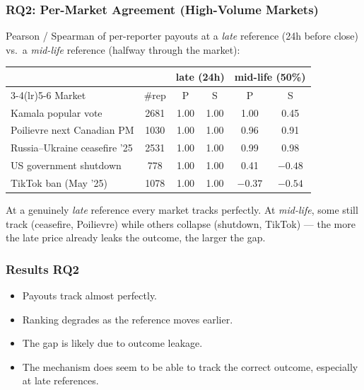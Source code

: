 \documentclass[
	11pt, %
]{beamer}
\begin{document}
\begin{frame}
	\frametitle{RQ2: Per-Market Agreement (High-Volume Markets)}

	Pearson / Spearman of per-reporter payouts at a \emph{late} reference (24h before close) vs.\ a \emph{mid-life} reference (halfway through the market):

	\medskip
	\begin{table}
		\centering
		\footnotesize
		\setlength{\tabcolsep}{6pt}
		\begin{tabular}{lccccc}
			\toprule
			& & \multicolumn{2}{c}{late (24h)} & \multicolumn{2}{c}{mid-life (50\%)} \\
			\cmidrule(lr){3-4}\cmidrule(lr){5-6}
			Market & \#rep & P & S & P & S \\
			\midrule
			Kamala popular vote        & 2681 & 1.00 & 1.00 & 1.00 & 0.45 \\
			Poilievre next Canadian PM & 1030 & 1.00 & 1.00 & 0.96 & 0.91 \\
			Russia--Ukraine ceasefire '25 & 2531 & 1.00 & 1.00 & 0.99 & 0.98 \\
			US government shutdown     &  778 & 1.00 & 1.00 & 0.41 & $-0.48$ \\
			TikTok ban (May '25)       & 1078 & 1.00 & 1.00 & $-0.37$ & $-0.54$ \\
			\bottomrule
		\end{tabular}
	\end{table}

	\medskip
	{\footnotesize At a genuinely \emph{late} reference every market tracks perfectly. At \emph{mid-life}, some still track (ceasefire, Poilievre) while others collapse (shutdown, TikTok) --- the more the late price already leaks the outcome, the larger the gap.}
\end{frame}



\begin{frame}
	\frametitle{Results RQ2}
	\begin{itemize}
		\item Payouts track almost perfectly.
		\item Ranking degrades as the reference moves earlier.
		\item The gap is likely due to outcome leakage.
		\item The mechanism does seem to be able to track the correct outcome, especially at late references.
	\end{itemize}
\end{frame}
\end{document}
